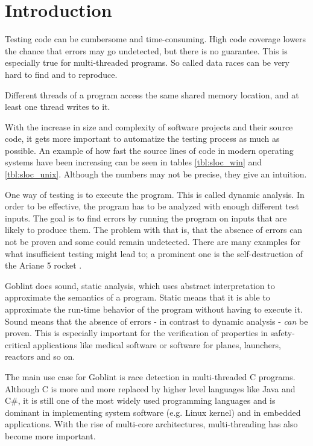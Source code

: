 \chapter{Introduction}
\label{chap:introduction}
Testing code can be cumbersome and time-consuming. High code coverage lowers the chance that errors may go undetected, but there is no guarantee. This is especially true for multi-threaded programs. So called data races can be very hard to find and to reproduce.

\begin{definition}
 Different threads of a program access the same shared memory location, and at least one thread writes to it.
\end{definition}

With the increase in size and complexity of software projects and their source code, it gets more important to automatize the testing process as much as possible. An example of how fast the source lines of code in modern operating systems have been increasing can be seen in tables \ref{tbl:sloc_win} and \ref{tbl:sloc_unix}. Although the numbers may not be precise, they give an intuition.



One way of testing is to execute the program. This is called dynamic analysis. In order to be effective, the program has to be analyzed with enough different test inputs. The goal is to find errors by running the program on inputs that are likely to produce them. The problem with that is, that the absence of errors can not be proven and some could remain undetected. There are many examples for what insufficient testing might lead to; a prominent one is the self-destruction of the Ariane 5 rocket \cite{Dowson:1997:ASF:251880.251992}.

Goblint does sound, static analysis, which uses abstract interpretation to approximate the semantics of a program. Static means that it is able to approximate the run-time behavior of the program without having to execute it. Sound means that the absence of errors - in contrast to dynamic analysis - \textit{can} be proven. This is especially important for the verification of properties in safety-critical applications like medical software or software for planes, launchers, reactors and so on.

The main use case for Goblint is race detection in multi-threaded C programs. Although C is more and more replaced by higher level languages like Java and C\#, it is still one of the most widely used programming languages and is dominant in implementing system software (e.g. Linux kernel) and in embedded applications. With the rise of multi-core architectures, multi-threading has also become more important.

